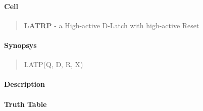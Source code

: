 \label{LATRP}
\paragraph{Cell}
\begin{quote}
    \textbf{LATRP} - a High-active D-Latch with high-active Reset
\end{quote}

\paragraph{Synopsys}
\begin{quote}
    LATP(Q, D, R, X)
\end{quote}

\paragraph{Description}

%

\paragraph{Truth Table}
%

